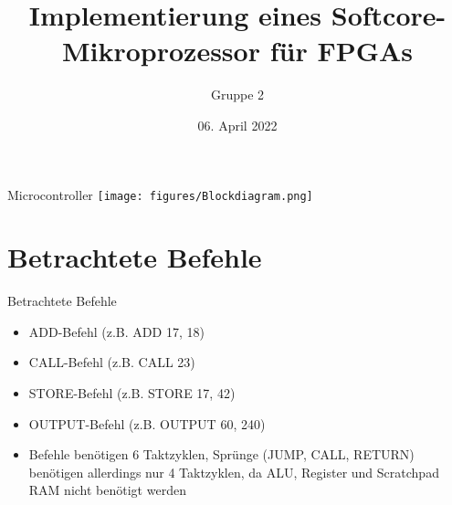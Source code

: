 \documentclass[10pt, t,
aspectratio=169,%
usenames,
dvipsnames,
]{beamer}
\title[Mikroprozessor Architektur] %
{Implementierung eines Softcore-Mikroprozessor für FPGAs}
\author[] %
{Gruppe 2}
\institute[] %
{
}
\date[] %
{06. April 2022}
\begin{document}
	\frame{\titlepage}
	\begin{frame}{Microcontroller}
		\texttt{[image: figures/Blockdiagram.png]}
	\end{frame}
	\section{Betrachtete Befehle}
	\begin{frame}{Betrachtete Befehle}
		\begin{itemize}
			\item ADD-Befehl (z.B. ADD 17, 18)
			\item CALL-Befehl (z.B. CALL 23)
			\item STORE-Befehl (z.B. STORE 17, 42)
			\item OUTPUT-Befehl (z.B. OUTPUT 60, 240)
			\item Befehle benötigen 6 Taktzyklen, Sprünge (JUMP, CALL, RETURN) benötigen allerdings nur 4 Taktzyklen, da ALU, Register und Scratchpad RAM nicht benötigt werden
		\end{itemize}
	\end{frame}
\end{document}
